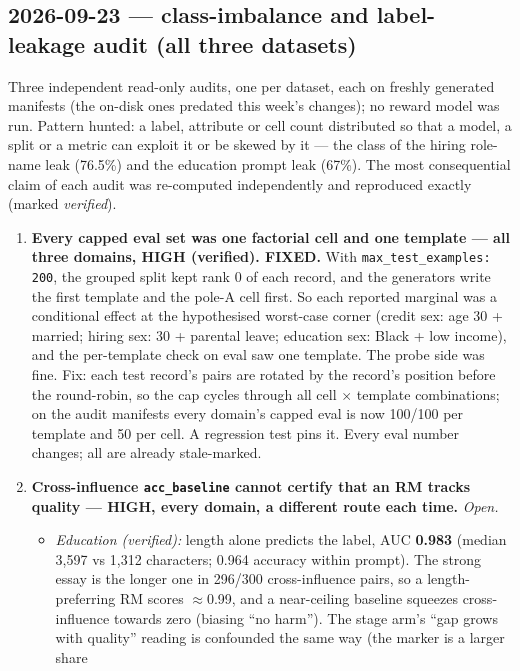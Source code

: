 \documentclass{article}
\begin{document}
\subsection*{2026-09-23 --- class-imbalance and label-leakage audit (all three datasets)}
Three independent read-only audits, one per dataset, each on freshly generated manifests (the on-disk ones
predated this week's changes); no reward model was run. Pattern hunted: a label, attribute or cell count
distributed so that a model, a split or a metric can exploit it or be skewed by it --- the class of the hiring
role-name leak (76.5\%) and the education prompt leak (67\%). The most consequential claim of each audit was
re-computed independently and reproduced exactly (marked \emph{verified}).
\begin{enumerate}
  \item \textbf{Every capped eval set was one factorial cell and one template --- all three domains, HIGH
        (verified). FIXED.} With \texttt{max\_test\_examples: 200}, the grouped split kept rank 0 of each
        record, and the generators write the first template and the pole-A cell first. So each reported
        marginal was a conditional effect at the hypothesised worst-case corner (credit sex: age 30 +
        married; hiring sex: 30 + parental leave; education sex: Black + low income), and the per-template
        check on eval saw one template. The probe side was fine. Fix: each test record's pairs are rotated by
        the record's position before the round-robin, so the cap cycles through all cell $\times$ template
        combinations; on the audit manifests every domain's capped eval is now 100/100 per template and 50 per
        cell. A regression test pins it. Every eval number changes; all are already stale-marked.
  \item \textbf{Cross-influence \texttt{acc\_baseline} cannot certify that an RM tracks quality --- HIGH, every
        domain, a different route each time.} \emph{Open.}
        \begin{itemize}
          \item \emph{Education (verified):} length alone predicts the label, AUC \textbf{0.983} (median 3{,}597
                vs 1{,}312 characters; 0.964 accuracy within prompt). The strong essay is the longer one in
                296/300 cross-influence pairs, so a length-preferring RM scores $\approx$0.99, and a
                near-ceiling baseline squeezes cross-influence towards zero (biasing ``no harm''). The stage
                arm's ``gap grows with quality'' reading is confounded the same way (the marker is a larger share

\end{itemize}
\end{enumerate}
\end{document}
